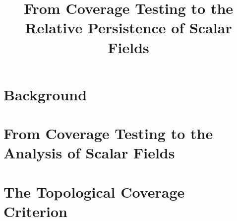 \documentclass[12pt]{article}
\title{From Coverage Testing to the Relative Persistence of Scalar Fields}
\begin{document}
  \maketitle

  
  
  \clearpage

  \section{Background}
  
  
  
  
  \clearpage

  \section{From Coverage Testing to the Analysis of Scalar Fields}
  

  \section{The Topological Coverage Criterion}
  
  
  
  

  
  
\end{document}
